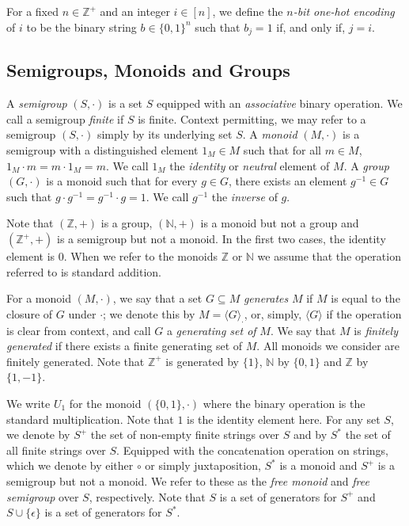 \documentclass[a4paper,UKenglish,cleveref, autoref, thm-restate, anonymous]{lipics-v2021}
\begin{document}
For a fixed $n \in \mathbb{Z}^+$ and an integer $i \in [n]$, we define the \emph{$n$-bit one-hot encoding} of $i$ to be the binary string $b \in \{0,1\}^n$ such that $b_j = 1$ if, and only if,  $j = i$.

\subsection{Semigroups, Monoids and Groups}
\label{sec:backgroundsemi}

A \emph{semigroup} $(S, \cdot)$ is a set $S$ equipped with an \emph{associative} binary operation.  We call a semigroup \emph{finite} if $S$ is finite. Context permitting, we may refer to a semigroup $(S, \cdot)$ simply by its underlying set $S$.  A \emph{monoid} $(M, \cdot)$ is a semigroup with a distinguished element $1_M \in M$ such that for all $m \in M$, $1_M \cdot m = m \cdot 1_M = m$.  We call $1_M$ the \emph{identity} or \emph{neutral} element of $M$.  A \emph{group} $(G, \cdot)$ is a monoid such that for every $g \in G$, there exists an element $g^{-1} \in G$ such that $g \cdot g^{-1} = g^{-1} \cdot g = 1$.  We call $g^{-1}$ the \emph{inverse} of $g$.  

Note that $(\mathbb{Z},+)$ is a group, $(\mathbb{N},+)$ is a monoid but not a group and $(\mathbb{Z}^+,+)$ is a semigroup but not a monoid.  In the first two cases, the identity element is $0$.  When we refer to the monoids $\mathbb{Z}$ or $\mathbb{N}$ we assume that the operation referred to is standard addition.

For a monoid $(M, \cdot)$, we say that a set $G \subseteq M$ \emph{generates} $M$ if $M$ is equal to the closure of $G$ under $\cdot$; we denote this by $M = \langle G \rangle_{\cdot}$, or, simply, $\langle G \rangle$ if the operation is clear from context, and call $G$ a \emph{generating set of} $M$. We say that $M$ is \emph{finitely generated} if there exists a finite generating set of $M$.  All monoids we consider are finitely generated.  Note that $\mathbb{Z}^+$ is generated by $\{1\}$, $\mathbb{N}$ by $\{0,1\}$ and $\mathbb{Z}$ by $\{1,-1\}$.

We write $U_1$ for the monoid $(\{0,1\},\cdot)$ where the binary operation is the standard multiplication.  Note that $1$ is the identity element here.
For any set $S$, we denote by $S^+$ the set of non-empty finite strings over $S$ and by $S^*$ the set of all finite strings over $S$.  Equipped with the concatenation operation on strings, which we denote by either $\circ$ or simply juxtaposition, $S^*$ is a monoid and $S^+$ is a semigroup but not a monoid.  We refer to these as the \emph{free monoid} and \emph{free semigroup} over $S$, respectively.  Note that $S$ is a set of generators for $S^+$ and $S \cup \{\epsilon\}$ is a set of generators for $S^*$.
\end{document}
